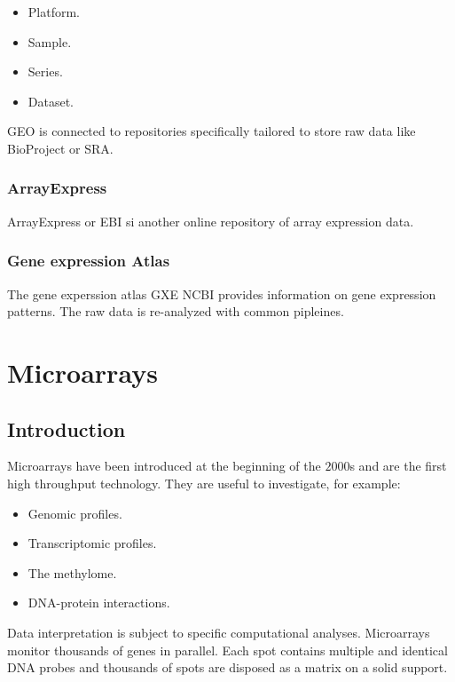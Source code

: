 		\begin{multicols}{4}
			\begin{itemize}
				\item Platform.
				\item Sample.
				\item Series.
				\item Dataset.
			\end{itemize}
		\end{multicols}

		GEO is connected to repositories specifically tailored to store raw data like BioProject or SRA.

		\subsubsection{ArrayExpress}
		ArrayExpress or EBI si another online repository of array expression data.

		\subsubsection{Gene expression Atlas}
		The gene experssion atlas GXE NCBI provides information on gene expression patterns.
		The raw data is re-analyzed with common pipleines.




\section{Microarrays}

	\subsection{Introduction}
	Microarrays have been introduced at the beginning of the $2000$s and are the first high throughput technology.
	They are useful to investigate, for example:

	\begin{multicols}{2}
		\begin{itemize}
			\item Genomic profiles.
			\item Transcriptomic profiles.
			\item The methylome.
			\item DNA-protein interactions.
		\end{itemize}
	\end{multicols}

	Data interpretation is subject to specific computational analyses.
	Microarrays monitor thousands of genes in parallel.
	Each spot contains multiple and identical DNA probes and thousands of spots are disposed as a matrix on a solid support.

